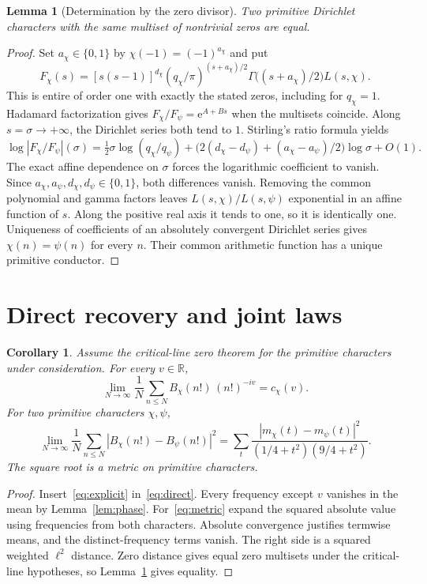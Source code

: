 \documentclass[11pt]{article}
\newtheorem{lemma}[theorem]{Lemma}
\newtheorem{corollary}[theorem]{Corollary}
\newcommand{\R}{\mathbb R}
\newcommand{\e}{\mathrm e}
\begin{document}
\begin{lemma}[Determination by the zero divisor]\label{lem:id}
Two primitive Dirichlet characters with the same multiset of nontrivial
zeros are equal.
\end{lemma}
\begin{proof}
Set $a_\chi\in\{0,1\}$ by $\chi(-1)=(-1)^{a_\chi}$ and put
\[
 F_\chi(s)=[s(s-1)]^{d_\chi}
 (q_\chi/\pi)^{(s+a_\chi)/2}
 \Gamma\big((s+a_\chi)/2\big)L(s,\chi).
\]
This is entire of order one with exactly the stated zeros, including
for $q_\chi=1$. Hadamard factorization gives
$F_\chi/F_\psi=\e^{A+Bs}$ when the multisets coincide.
Along $s=\sigma\to+\infty$, the Dirichlet series both tend to $1$.
Stirling's ratio formula yields
\[
 \log|F_\chi/F_\psi|(\sigma)
 =\tfrac12\sigma\log(q_\chi/q_\psi)
 +\big(2(d_\chi-d_\psi)+(a_\chi-a_\psi)/2\big)\log\sigma+O(1).
\]
The exact affine dependence on $\sigma$ forces the logarithmic
coefficient to vanish. Since $a_\chi,a_\psi,d_\chi,d_\psi\in\{0,1\}$,
both differences vanish. Removing the common polynomial and gamma
factors leaves $L(s,\chi)/L(s,\psi)$ exponential in an affine
function of $s$. Along the positive real axis it tends to one,
so it is identically one. Uniqueness of coefficients of an absolutely
convergent Dirichlet series gives $\chi(n)=\psi(n)$ for every $n$.
Their common arithmetic function has a unique primitive conductor.
\end{proof}

\section{Direct recovery and joint laws}
\begin{corollary}\label{cor:distance}
Assume the critical-line zero theorem for the primitive characters
under consideration. For every $v\in\R$,
\begin{equation}\label{eq:direct}
 \lim_{N\to\infty}\frac1N\sum_{n\le N} B_\chi(n!)\,(n!)^{-iv}=c_\chi(v).
\end{equation}
For two primitive characters $\chi,\psi$,
\begin{equation}\label{eq:metric}
 \lim_{N\to\infty}\frac1N\sum_{n\le N}|B_\chi(n!)-B_\psi(n!)|^2
 =\sum_t\frac{|m_\chi(t)-m_\psi(t)|^2}{(1/4+t^2)(9/4+t^2)}.
\end{equation}
The square root is a metric on primitive characters.
\end{corollary}
\begin{proof}
Insert~\eqref{eq:explicit} in~\eqref{eq:direct}. Every frequency except
$v$ vanishes in the mean by Lemma~\ref{lem:phase}. For~\eqref{eq:metric}
expand the squared absolute value using frequencies from both
characters. Absolute convergence justifies termwise means, and the
distinct-frequency terms vanish. The right side is a squared weighted
$\ell^2$ distance. Zero distance gives equal zero multisets under
the critical-line hypotheses, so Lemma~\ref{lem:id} gives equality.
\end{proof}
\end{document}
